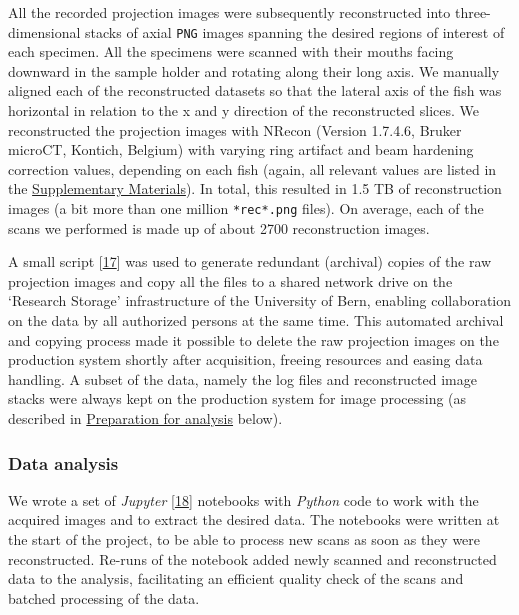 All the recorded projection images were subsequently reconstructed into three-dimensional stacks of axial \texttt{PNG} images spanning the desired regions of interest of each specimen.
All the specimens were scanned with their mouths facing downward in the sample holder and rotating along their long axis.
We manually aligned each of the reconstructed datasets so that the lateral axis of the fish was horizontal in relation to the x and y direction of the reconstructed slices.
We reconstructed the projection images with NRecon (Version 1.7.4.6, Bruker microCT, Kontich, Belgium) with varying ring artifact and beam hardening correction values, depending on each fish (again, all relevant values are listed in the \protect\hyperlink{supplementary-materials}{Supplementary Materials}).
In total, this resulted in 1.5 TB of reconstruction images (a bit more than one million \texttt{*rec*.png} files).
On average, each of the scans we performed is made up of about 2700 reconstruction images.

A small script {[}\protect\hyperlink{ref-ZjgrPHTa}{17}{]} was used to generate redundant (archival) copies of the raw projection images and copy all the files to a shared network drive on the `Research Storage' infrastructure of the University of Bern, enabling collaboration on the data by all authorized persons at the same time.
This automated archival and copying process made it possible to delete the raw projection images on the production system shortly after acquisition, freeing resources and easing data handling.
A subset of the data, namely the log files and reconstructed image stacks were always kept on the production system for image processing (as described in \protect\hyperlink{preparation-for-analysis}{Preparation for analysis} below).

\hypertarget{data-analysis}{%
\subsubsection{Data analysis}\label{data-analysis}}

We wrote a set of \emph{Jupyter} {[}\protect\hyperlink{ref-pQ6Wbz73}{18}{]} notebooks with \emph{Python} code to work with the acquired images and to extract the desired data.
The notebooks were written at the start of the project, to be able to process new scans as soon as they were reconstructed.
Re-runs of the notebook added newly scanned and reconstructed data to the analysis, facilitating an efficient quality check of the scans and batched processing of the data.


